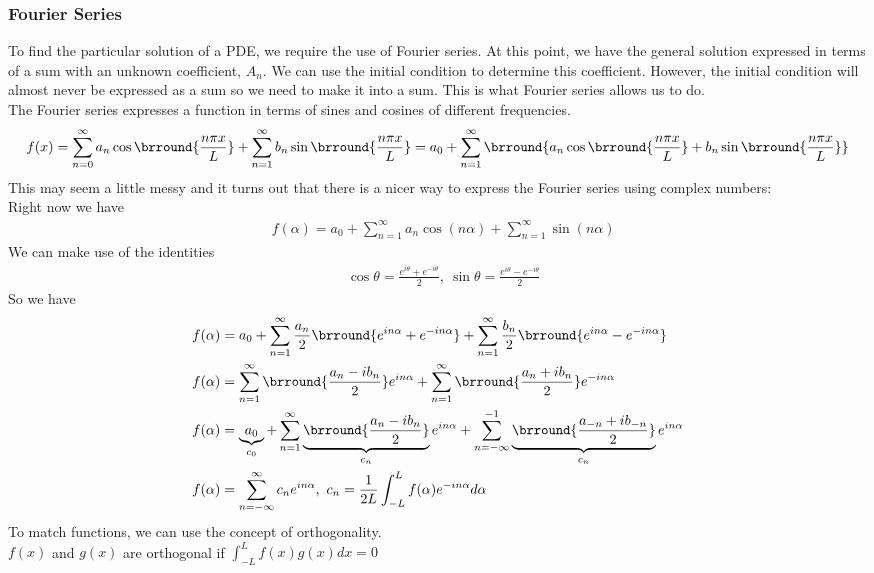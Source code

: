 \subsubsection{Fourier Series}
To find the particular solution of a PDE, we require the use of Fourier series. At this point, we have the general solution expressed in terms of a sum with an unknown coefficient, $A_n$. We can use the initial condition to determine this coefficient. However, the initial condition will almost never be expressed as a sum so we need to make it into a sum. This is what Fourier series allows us to do.\\
The Fourier series expresses a function in terms of sines and cosines of different frequencies.
$$f(x)=\sum_{n=0}^\infty a_n\cos\brround{\frac{n\pi x}{L}}+\sum_{n=1}^\infty b_n\sin\brround{\frac{n\pi x}{L}}=a_0+\sum_{n=1}^\infty\brround{a_n\cos\brround{\frac{n\pi x}{L}}+b_n\sin\brround{\frac{n\pi x}{L}}}$$
This may seem a little messy and it turns out that there is a nicer way to express the Fourier series using complex numbers:\\
Right now we have
\begin{align*}
    &f(\alpha)=a_0+\sum_{n=1}^\infty a_n\cos(n\alpha)+\sum_{n=1}^\infty\sin(n\alpha)
\end{align*}
We can make use of the identities
\begin{align*}
    &\cos\theta=\frac{e^{i\theta}+e^{-i\theta}}{2},\ \sin\theta=\frac{e^{i\theta}-e^{-i\theta}}{2}
\end{align*}
So we have
\begin{align*}    
    &f(\alpha)=a_0+\sum_{n=1}^\infty\frac{a_n}{2}\brround{e^{in\alpha}+e^{-in\alpha}}+\sum_{n=1}^\infty\frac{b_n}{2}\brround{e^{in\alpha}-e^{-in\alpha}}\\
    &f(\alpha)=\sum_{n=1}^\infty\brround{\frac{a_n-ib_n}{2}}e^{in\alpha}+\sum_{n=1}^\infty\brround{\frac{a_n+ib_n}{2}}e^{-in\alpha}\\
    &f(\alpha)=\underbrace{a_0}_{c_0}+\sum_{n=1}^\infty\underbrace{\brround{\frac{a_n-ib_n}{2}}}_{c_n}e^{in\alpha}+\sum_{n=-\infty}^{-1}\underbrace{\brround{\frac{a_{-n}+ib_{-n}}{2}}}_{c_n}e^{in\alpha}\\
    &f(\alpha)=\sum_{n=-\infty}^\infty c_ne^{in\alpha},\ c_n=\frac{1}{2L}\int_{-L}^Lf(\alpha)e^{-in\alpha}d\alpha
\end{align*}
To match functions, we can use the concept of orthogonality.\\
$f(x)$ and $g(x)$ are orthogonal if $\displaystyle{\int_{-L}^Lf(x)g(x)dx=0}$\\
